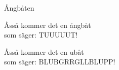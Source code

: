 \begin{song}{Ångbåten}
	
	
	Åsså kommer det en ångbåt\\
	som säger: TUUUUUT!
	
	Åsså kommer det en ubåt\\
	som säger: BLUBGRRGLLBLUPP!
	
\end{song}
